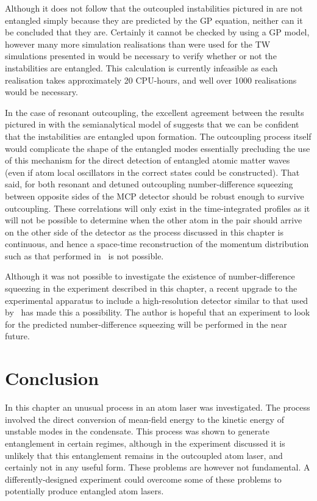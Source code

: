 Although it does not follow that the outcoupled instabilities pictured in  are not entangled simply because they are predicted by the GP equation, neither can it be concluded that they are.  Certainly it cannot be checked by using a GP model, however many more simulation realisations than were used for the TW simulations presented in  would be necessary to verify whether or not the instabilities are entangled.  This calculation is currently infeasible as each realisation takes approximately 20 CPU-hours, and well over 1000 realisations would be necessary.  

In the case of resonant outcoupling, the excellent agreement between the results pictured in  with the semianalytical model of  suggests that we can be confident that the instabilities are entangled upon formation.  The outcoupling process itself would complicate the shape of the entangled modes essentially precluding the use of this mechanism for the direct detection of entangled atomic matter waves (even if atom local oscillators in the correct states could be constructed).  That said, for both resonant and detuned outcoupling number-difference squeezing between opposite sides of the MCP detector should be robust enough to survive outcoupling.  These correlations will only exist in the time-integrated profiles as it will not be possible to determine when the other atom in the pair should arrive on the other side of the detector as the process discussed in this chapter is continuous, and hence a space-time reconstruction of the momentum distribution such as that performed in~\citep{Perrin:2007} is not possible.

Although it was not possible to investigate the existence of number-difference squeezing in the experiment described in this chapter, a recent upgrade to the experimental apparatus to include a high-resolution detector similar to that used by~\citet{Perrin:2007} has made this a possibility.  The author is hopeful that an experiment to look for the predicted number-difference squeezing will be performed in the near future.

\section{Conclusion}

In this chapter an unusual process in an atom laser was investigated.  The process involved the direct conversion of mean-field energy to the kinetic energy of unstable modes in the condensate.  This process was shown to generate entanglement in certain regimes, although in the experiment discussed it is unlikely that this entanglement remains in the outcoupled atom laser, and certainly not in any useful form.  These problems are however not fundamental.  A differently-designed experiment could overcome some of these problems to potentially produce entangled atom lasers.

